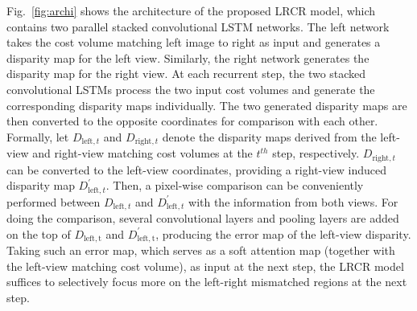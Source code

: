 \documentclass[10pt,twocolumn,letterpaper]{article}
\begin{document}
Fig.~\ref{fig:archi} shows the architecture of the proposed LRCR model, which contains two parallel stacked convolutional LSTM networks. The left network takes the cost volume matching left image to right as input and generates a disparity map for the left view. Similarly, the right network generates the disparity map for the right view. At each recurrent step, the two stacked convolutional LSTMs process the two input cost volumes and generate the corresponding disparity maps individually. The two generated disparity maps are then converted to the opposite coordinates \cite{seki2016patch} for comparison with each other. Formally, let $D_{\mathrm{left}, t}$  and $D_{\mathrm{right}, t}$ denote the disparity maps derived from the left-view and  right-view matching cost volumes at the $t^{th}$ step, respectively.   $D_{\mathrm{right}, t}$  can be converted to the left-view coordinates, providing a right-view induced   disparity map $D_{\mathrm{left}, t}^{\prime}$.  Then,  a pixel-wise comparison can be conveniently performed between $D_{\mathrm{left}, t}$ and $D_{\mathrm{left}, t}^{\prime}$ with the information from both views. For doing the comparison,  several convolutional layers and pooling layers are added on the top of  $D_{\mathrm{left, t}}$ and $D_{\mathrm{left, t}}^{\prime}$, producing  the error map of the left-view disparity. Taking such an error map, which serves as a soft attention map (together with the left-view matching cost volume), as  input at the next step, the LRCR model suffices  to selectively focus more on the left-right mismatched  regions at the next step. 

\end{document}
